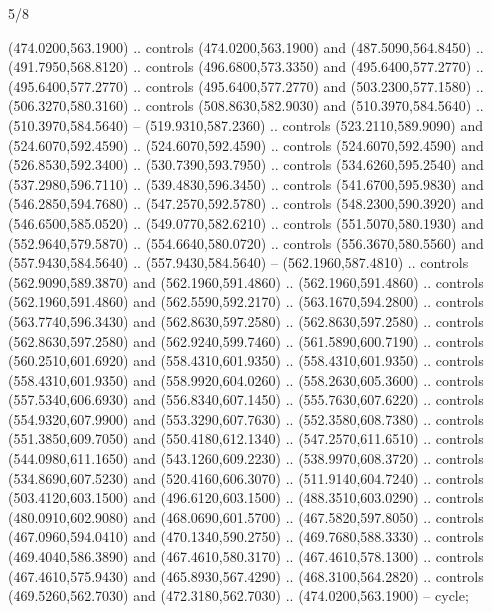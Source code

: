 \begin{flagdescription}{5/8}
\begin{scope}[shift={(m)}]
\begin{scope}[scale=\flagwidth/220,y=0.1mm, x=0.1mm, yscale=-1,shift={(-596,-360)}]
\begin{scope}[draw=black,line join=round,line cap=round,line width=0.381\lw]
\begin{scope}[fill=white,line width=1.143\lw]
 (474.0200,563.1900) .. controls (474.0200,563.1900) and
  (487.5090,564.8450) .. (491.7950,568.8120) .. controls (496.6800,573.3350) and
  (495.6400,577.2770) .. (495.6400,577.2770) .. controls (495.6400,577.2770) and
  (503.2300,577.1580) .. (506.3270,580.3160) .. controls (508.8630,582.9030) and
  (510.3970,584.5640) .. (510.3970,584.5640) -- (519.9310,587.2360) .. controls
  (523.2110,589.9090) and (524.6070,592.4590) .. (524.6070,592.4590) .. controls
  (524.6070,592.4590) and (526.8530,592.3400) .. (530.7390,593.7950) .. controls
  (534.6260,595.2540) and (537.2980,596.7110) .. (539.4830,596.3450) .. controls
  (541.6700,595.9830) and (546.2850,594.7680) .. (547.2570,592.5780) .. controls
  (548.2300,590.3920) and (546.6500,585.0520) .. (549.0770,582.6210) .. controls
  (551.5070,580.1930) and (552.9640,579.5870) .. (554.6640,580.0720) .. controls
  (556.3670,580.5560) and (557.9430,584.5640) .. (557.9430,584.5640) --
  (562.1960,587.4810) .. controls (562.9090,589.3870) and (562.1960,591.4860) ..
  (562.1960,591.4860) .. controls (562.1960,591.4860) and (562.5590,592.2170) ..
  (563.1670,594.2800) .. controls (563.7740,596.3430) and (562.8630,597.2580) ..
  (562.8630,597.2580) .. controls (562.8630,597.2580) and (562.9240,599.7460) ..
  (561.5890,600.7190) .. controls (560.2510,601.6920) and (558.4310,601.9350) ..
  (558.4310,601.9350) .. controls (558.4310,601.9350) and (558.9920,604.0260) ..
  (558.2630,605.3600) .. controls (557.5340,606.6930) and (556.8340,607.1450) ..
  (555.7630,607.6220) .. controls (554.9320,607.9900) and (553.3290,607.7630) ..
  (552.3580,608.7380) .. controls (551.3850,609.7050) and (550.4180,612.1340) ..
  (547.2570,611.6510) .. controls (544.0980,611.1650) and (543.1260,609.2230) ..
  (538.9970,608.3720) .. controls (534.8690,607.5230) and (520.4160,606.3070) ..
  (511.9140,604.7240) .. controls (503.4120,603.1500) and (496.6120,603.1500) ..
  (488.3510,603.0290) .. controls (480.0910,602.9080) and (468.0690,601.5700) ..
  (467.5820,597.8050) .. controls (467.0960,594.0410) and (470.1340,590.2750) ..
  (469.7680,588.3330) .. controls (469.4040,586.3890) and (467.4610,580.3170) ..
  (467.4610,578.1300) .. controls (467.4610,575.9430) and (465.8930,567.4290) ..
  (468.3100,564.2820) .. controls (469.5260,562.7030) and (472.3180,562.7030) ..
  (474.0200,563.1900) -- cycle;


\end{scope}
\end{scope}
\end{scope}
\end{scope}
\end{flagdescription}

